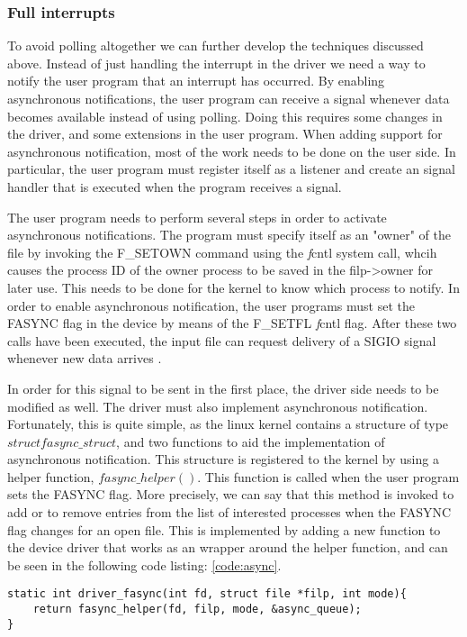 \subsubsection{Full interrupts}
To avoid polling altogether we can further develop the techniques discussed above. Instead of just handling the interrupt in the driver we need a way to notify the user program that an interrupt has occurred. By enabling asynchronous notifications, the user program can receive a signal whenever data becomes available instead of using polling. Doing this requires some changes in the driver, and some extensions in the user program. When adding support for asynchronous notification, most of the work needs to be done on the user side. In particular, the user program must register itself as a listener and create an signal handler that is executed when the program receives a signal. 

The user program needs to perform several steps in order to activate asynchronous notifications. The program must specify itself as an "owner" of the file by invoking the F\_SETOWN command using the {\emph fcntl} system call, whcih causes the process ID of the owner process to be saved in the filp->owner for later use. This needs to be done for the kernel to know which process to notify. In order to enable asynchronous notification, the user programs must set the FASYNC flag in the device by means of the F\_SETFL {\emph fcntl} flag. After these two calls have been executed, the input file can request delivery of a SIGIO signal whenever new data arrives \cite{linux}.

In order for this signal to be sent in the first place, the driver side needs to be modified as well. The driver must also implement asynchronous notification. Fortunately, this is quite simple, as the linux kernel contains a structure of type $struct fasync\_struct$, and  two functions to aid the implementation of asynchronous notification. This structure  is registered to the kernel by using a helper function, $fasync\_helper()$. This function is called when the user program sets the FASYNC flag. More precisely, we can say that this method is invoked to add or to remove entries from the list of interested processes when the FASYNC flag changes for an open file. This is implemented by adding a new function to the device driver that works as an wrapper around the helper function, and can be seen in the following code listing: \ref{code:async}.

\begin{lstlisting}[caption=Activate process as listener, label=code:async]
static int driver_fasync(int fd, struct file *filp, int mode){
    return fasync_helper(fd, filp, mode, &async_queue);
}
\end{lstlisting}

